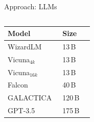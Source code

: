 \documentclass[en,16:9,smallfoot]{sdqbeamer}
\begin{document}
\begin{frame}{Approach: LLMs}
\begin{columns}
\begin{overlayarea}{\textwidth}{2.45cm}
{\begin{table}
\begin{tabular}{llc}
            Model & Size \\ %
            \hline
            WizardLM~\cite{xu2023wizardlm2023}
            & 13\,B \\
            Vicuna${}_{4k}$~\cite{vicuna2023}
            & 13\,B \\
            Vicuna${}_{16k}$~\cite{vicuna2023}
            & 13\,B \\
            Falcon~\cite{falcon40b-huggingface}
            & 40\,B \\
            GALACTICA~\cite{GALACTICA2022}
            & 120\,B \\
            GPT-3.5~\cite{Brown2020gpt3}
            & 175\,B \\
            \hline
            \end{tabular}
        \end{table}
        }
        \end{overlayarea}
   \end{columns}
   \end{frame}
\end{document}
